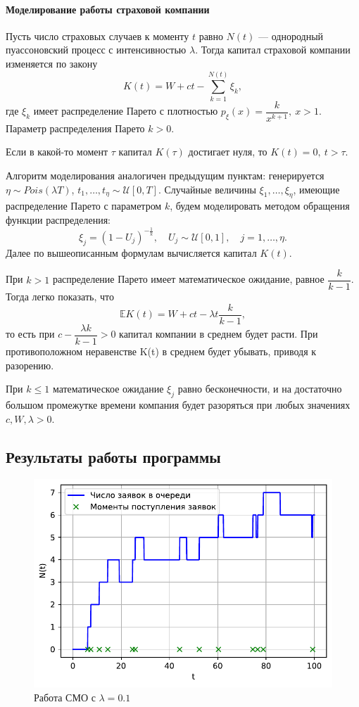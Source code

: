 \documentclass[16pt]{article}
\begin{document}
\paragraph{Моделирование работы страховой компании}
Пусть число страховых случаев к моменту $t$ равно $N(t)$ --- однородный пуассоновский процесс с интенсивностью $\lambda$. Тогда капитал страховой компании изменяется по закону
$$K(t) = W + ct - \sum_{k=1}^{N(t)}\xi_k,$$
где $\xi_k$ имеет распределение Парето с плотностью $p_\xi(x) = \dfrac{k}{x^{k+1}}, \ x > 1$. Параметр распределения Парето $k > 0$.

Если в какой-то момент $\tau$ капитал $K(\tau)$ достигает нуля, то $K(t) = 0, \ t > \tau$.

Алгоритм моделирования аналогичен предыдущим пунктам: генерируется $\eta \sim Pois(\lambda T)$,
$t_1, \ldots, t_\eta \sim \mathcal{U}[0, T]$. Случайные величины $\xi_1, \ldots, \xi_\eta$, имеющие распределение Парето с параметром $k$, будем моделировать методом обращения функции распределения:
$$\xi_j = (1 - U_j)^{-\frac{1}{k}}, \quad U_j \sim \mathcal{U}[0, 1], \quad j = 1, \ldots, \eta.$$
Далее по вышеописанным формулам вычисляется капитал $K(t)$.

При $k > 1$ распределение Парето имеет математическое ожидание, равное $\dfrac{k}{k-1}$. Тогда легко показать, что 
$$\mathbb{E}K(t) = W + ct - \lambda t \dfrac{k}{k-1},$$
то есть при $c - \dfrac{\lambda k}{k-1} > 0$ капитал компании в среднем будет расти. При противоположном неравенстве K(t) в среднем будет убывать, приводя к разорению. 

При $k \leq 1$ математическое ожидание $\xi_j$ равно бесконечности, и на достаточно большом промежутке времени компания  будет разоряться при любых значениях $c, W, \lambda > 0$.
\subsection{Результаты работы программы}

\begin{figure}
	\center
	\includegraphics[scale=0.7]{11_1.pdf}
	\caption{Работа СМО с $\lambda = 0.1$}
\end{figure}
\end{document}
